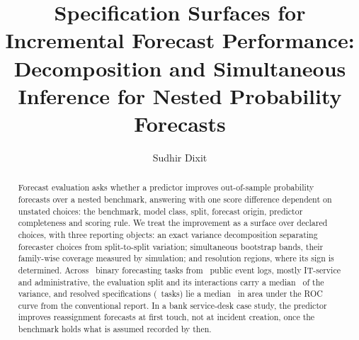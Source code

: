 \documentclass[11pt,3p,review,authoryear]{elsarticle}
\theoremstyle{definition}
\newif\ifblind
\begin{document}
\begin{frontmatter}

\title{Specification Surfaces for Incremental Forecast Performance:
Decomposition and Simultaneous Inference for Nested Probability Forecasts}

\ifblind\else
\author[ind]{Sudhir Dixit}
\address[ind]{Independent Researcher, \affiliationStreet, \affiliationCity, \affiliationRegion, \affiliationCountry}
\fi

\begin{abstract}
Forecast evaluation asks whether a predictor improves out-of-sample
probability forecasts over a nested benchmark, answering with one score
difference dependent on unstated choices: the benchmark, model class,
split, forecast origin, predictor completeness and scoring rule. We treat
the improvement as a surface over declared choices, with three
reporting objects: an exact variance decomposition separating
forecaster choices from split-to-split variation; simultaneous bootstrap
bands, their family-wise coverage measured by simulation; and resolution
regions, where its sign is determined. Across \nPairs\ binary forecasting tasks from
\nLogs\ public event logs, mostly IT-service and
administrative, the evaluation split and its interactions carry a median
\shareResamplingStratumPct\ of the variance, and resolved specifications (\nPairsMadResolved\ tasks) lie a
median \madResolvedMedian\ in area under the ROC curve from the conventional
report. In a bank
service-desk case study, the predictor improves reassignment forecasts at
first touch, not at incident creation, once the benchmark holds what is
assumed recorded by then.
\end{abstract}


\end{frontmatter}
\end{document}
